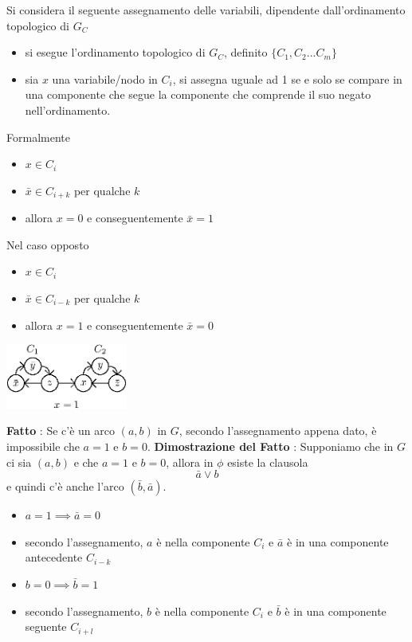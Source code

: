\documentclass[10pt, letterpaper]{report}
\begin{document}
Si considera il seguente assegnamento delle variabili, dipendente dall'ordinamento topologico di $G_C$\begin{itemize}
    \item si esegue l'ordinamento topologico di $G_C$, definito $\{C_1, C_2 \dots C_m\}$
    \item sia $x$ una variabile/nodo in $C_i$, si assegna uguale ad 1 se e solo se compare in una componente che segue la componente che comprende il suo negato nell'ordinamento.
\end{itemize}
Formalmente \begin{itemize}
    \item $x\in C_i$
    \item $\bar x \in C_{i+k}$ per qualche $k$
    \item allora $x=0$ e conseguentemente $\bar x = 1$
\end{itemize}
Nel caso opposto
\begin{itemize}
    \item $x\in C_i$
    \item $\bar x \in C_{i-k}$ per qualche $k$
    \item allora $x=1$ e conseguentemente $\bar x = 0$
\end{itemize}
\begin{center}
    \includegraphics[width=0.3\textwidth ]{images/ordTop.eps}
\end{center}
\textbf{Fatto} :  Se c'è un arco $(a,b)$ in $G$, secondo l'assegnamento appena dato, è impossibile che $a=1$ e $b=0$.
\acc \textbf{Dimostrazione del Fatto} : Supponiamo che in $G$ ci sia $(a,b)$ e che $a=1$ e $b=0$, allora in $\phi$ esiste la clausola $$\bar a \lor b$$
e quindi c'è anche l'arco $(\bar b , \bar a)$.\begin{itemize}
    \item $ a = 1 \implies \bar a = 0$
    \item secondo l'assegnamento, $a$ è nella componente $C_i$ e $\bar a$ è in una componente antecedente $C_{i-k}$
    \item   $ b = 0 \implies \bar b = 1$
    \item secondo l'assegnamento, $b$ è nella componente $C_i$ e $\bar b$ è in una componente seguente $C_{i+l}$
\end{itemize}
\end{document}
